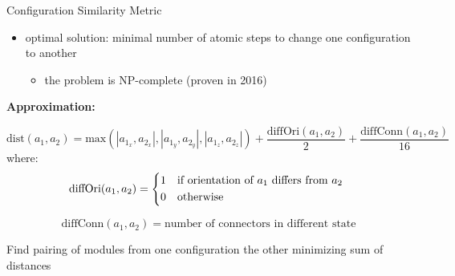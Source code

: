 \documentclass[ignorenonframetext,aspectratio=169,]{paradise-slide}
\providecommand{\tightlist}{%
  \setlength{\itemsep}{0pt}\setlength{\parskip}{0pt}}
\begin{document}
\begin{frame}[fragile]{Configuration Similarity Metric}
\protect\hypertarget{configuration-similarity-metric}{}

\begin{itemize}
\tightlist
\item
  optimal solution: minimal number of atomic steps to change one
  configuration to another

  \begin{itemize}
  \tightlist
  \item
    the problem is NP-complete (proven in 2016)
  \end{itemize}
\end{itemize}

\pause

\textbf{Approximation:}

\begin{equation*}
    \text{dist}(a_1, a_2) = \text{max}(|a_{1_x}, a_{2_x}|, |a_{1_y}, a_{2_y}|, |a_{1_z}, a_{2_z}|)
    + \frac{\text{diffOri}(a_1, a_2)}{2} + \frac{\text{diffConn}(a_1, a_2)}{16}
\end{equation*} where: \begin{equation*}
    \text{diffOri}(a_1, a_2) =
    \begin{cases*}
      1 & if orientation of $a_1$ differs from $a_2$ \\
      0 & otherwise
    \end{cases*}
\end{equation*}

\begin{equation*}
    \text{diffConn}(a_1, a_2) = \text{number of connectors in different state}
\end{equation*}

Find pairing of modules from one configuration the other minimizing sum
of distances

\end{frame}
\end{document}
